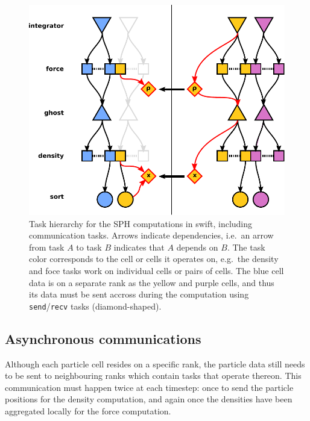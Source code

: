 \documentclass{sig-alternate-05-2015}
\newcommand{\swift}{{\sc swift}\xspace}
\begin{document}
\begin{figure}
\centering
\includegraphics[width=\columnwidth]{Figures/Hierarchy3}
\caption{Task hierarchy for the SPH computations in \swift,
  including communication tasks. Arrows indicate dependencies,
  i.e.~an arrow from task $A$ to task $B$ indicates that $A$
  depends on $B$. The task color corresponds to the cell or
  cells it operates on, e.g.~the density and foce tasks work
  on individual cells or pairs of cells.
  The blue cell data is on a separate rank as the yellow and
  purple cells, and thus its data must be sent accross during
  the computation using {\tt send}/{\tt recv} tasks (diamond-shaped).}
\label{tasks}
\end{figure}  


\subsection{Asynchronous communications}

Although each particle cell resides on a specific rank, the particle
data still needs to be sent to neighbouring ranks which contain
tasks that operate thereon.
This communication must happen twice at each timestep: once to send
the particle positions for the density computation, and again
once the densities have been aggregated locally for the force
computation.
\end{document}
